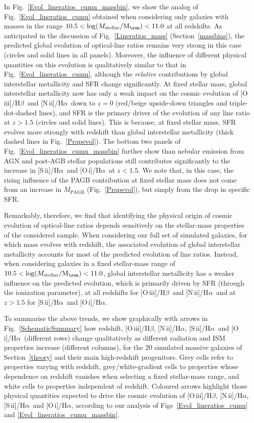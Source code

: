 \documentclass[fleqn,usenatbib]{mnras}
\newcommand{\Msun}{\hbox{M$_\sun$}}
\newcommand{\oiiihb}{\hbox{[O\,{\sc iii}]/H$\beta$}}
\newcommand{\niiha}{\hbox{[N\,{\sc ii}]/H$\alpha$}}
\newcommand{\siiha}{\hbox{[S\,{\sc ii}]/H$\alpha$}}
\newcommand{\oiha}{\hbox{[O\,{\sc i}]/H$\alpha$}}
\begin{document}
In Fig.~\ref{Evol_lineratios_cumu_massbin}, we show the analog of 
Fig.~\ref{Evol_lineratios_cumu} obtained when considering only
galaxies with  masses in the range $10.5<\log (M_{\rm
  stellar}/\Msun)<11.0$  at all redshifts. As anticipated in the
discussion of Fig.~\ref{Lineratios_mass} (Section~\ref{massbias}), the
predicted global evolution of optical-line ratios remains very strong
in this case (circles and solid lines in all panels). Moreover, the
influence of different physical quantities on this evolution is
qualitatively similar to that in Fig.~\ref{Evol_lineratios_cumu},
although the {\it relative} contributions by global interstellar
metallicity and SFR change significantly.  At fixed stellar mass,
global interstellar metallicity now has only a weak impact on the
cosmic evolution of \oiiihb\ and \niiha\ down to $z=0$ (red/beige
upside-down triangles and triple-dot-dashed lines), and SFR is the
primary driver of the evolution of any line ratio at $z>1.5$ (circles
and solid lines). This is because, at fixed stellar mass, SFR evolves
more strongly with redshift than global interstellar metallicity
(thick dashed lines in Fig.~\ref{Propevol}). The bottom two panels of
Fig.~\ref{Evol_lineratios_cumu_massbin} further show than nebular
emission from AGN and post-AGB stellar populations still contributes
significantly to the  increase in \siiha\ and \oiha\ at $z<1.5$. We
note that, in this case, the rising  influence of the PAGB
contribution at fixed stellar mass does not come from an  increase in
$M_\mathrm{PAGB}$ (Fig.~\ref{Propevol}), but simply from the  drop in
specific SFR.   

Remarkably, therefore, we find that identifying the physical origin of
cosmic evolution  of optical-line ratios depends sensitively on the
stellar-mass properties of the considered sample. When considering our
full set of simulated galaxies, for which mass evolves with redshift,
the associated evolution of global interstellar metallicity accounts
for most of the predicted evolution of line ratios. Instead, when
considering galaxies in a fixed stellar-mass range of $10.5<\log
(M_{\rm stellar}/\Msun)<11.0$,  global interstellar metallicity has a
weaker influence on the predicted evolution,  which is primarily
driven by SFR (through the ionization parameter), at all redshifts for
\oiiihb\ and \niiha\ and at $z>1.5$ for \siiha\ and \oiha. 

To summarise the above trends, we show graphically with arrows in
Fig.~\ref{SchematicSummary}  how redshift, \oiiihb, \niiha, \siiha\
and \oiha\ (different rows) change qualitatively as different
radiation and ISM properties increase (different columns), 
for the 20 simulated massive galaxies of Section~\ref{theory} 
and their main high-redshift progenitors. Grey cells refer to
properties varying with redshift, grey/white-gradient cells to
properties whose dependence on redshift vanishes when selecting a
fixed stellar-mass range, and white cells to properties independent of
redshift. Coloured arrows highlight those physical quantities expected
to drive the cosmic evolution of \oiiihb, \niiha, \siiha\ and \oiha,
according to our analysis of Figs~\ref{Evol_lineratios_cumu} and
\ref{Evol_lineratios_cumu_massbin}. 
\end{document}

